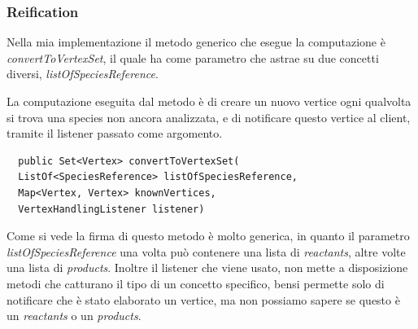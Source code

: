 \subsubsection*{Reification}
Nella mia implementazione il metodo generico che esegue la
computazione \`e \emph{convertToVertexSet}, il quale ha come parametro
che astrae su due concetti diversi, \emph{listOfSpeciesReference}. 

La computazione eseguita dal metodo \`e di creare un nuovo vertice
ogni qualvolta si trova una species non ancora analizzata, e di
notificare questo vertice al client, tramite il listener passato come
argomento.

\begin{lstlisting}
  public Set<Vertex> convertToVertexSet( 
  ListOf<SpeciesReference> listOfSpeciesReference, 
  Map<Vertex, Vertex> knownVertices,
  VertexHandlingListener listener) 
\end{lstlisting}
Come si vede la firma di questo metodo \`e molto generica, in quanto
il parametro \emph{listOfSpeciesReference} una volta pu\`o contenere
una lista di \emph{reactants}, altre volte una lista di
\emph{products}. Inoltre il listener che viene usato, non mette a
disposizione metodi che catturano il tipo di un concetto specifico,
bensi permette solo di notificare che \`e stato elaborato un vertice,
ma non possiamo sapere se questo \`e un \emph{reactants} o un
\emph{products}.


